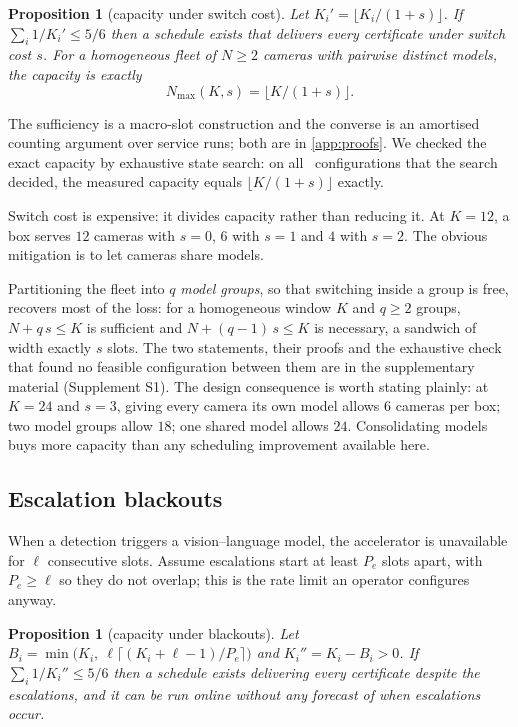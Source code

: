 \documentclass[final,5p,times,twocolumn]{elsarticle}
\newtheorem{proposition}[theorem]{Proposition}
\theoremstyle{definition}
\newcommand{\Nc}{N}
\newcommand{\Ki}{K_i}
\begin{document}
\begin{proposition}[capacity under switch cost]\label{prop:switch}
Let $K_i'=\lfloor \Ki/(1+s)\rfloor$. If $\sum_i 1/K_i'\le 5/6$ then a schedule exists that delivers
every certificate under switch cost $s$. For a homogeneous fleet of $\Nc\ge2$ cameras with
pairwise distinct models, the capacity is exactly
\[
N_{\max}(K,s)=\big\lfloor K/(1+s)\big\rfloor .
\]
\end{proposition}

The sufficiency is a macro-slot construction and the converse is an amortised counting argument
over service runs; both are in \ref{app:proofs}. We checked the exact capacity by exhaustive state
search: on all \numCtwoClean\ configurations that the search decided, the measured capacity equals
$\lfloor K/(1+s)\rfloor$ exactly.

Switch cost is expensive: it divides capacity rather than reducing it. At $K=12$, a box serves
$12$ cameras with $s=0$, $6$ with $s=1$ and $4$ with $s=2$. The obvious mitigation is to let
cameras share models.

Partitioning the fleet into $q$ \emph{model groups}, so that switching inside a group is free,
recovers most of the loss: for a homogeneous window $K$ and $q\ge2$ groups, $\Nc+q\,s\le K$ is
sufficient and $\Nc+(q-1)\,s\le K$ is necessary, a sandwich of width exactly $s$ slots. The two
statements, their proofs and the exhaustive check that found no feasible configuration between
them are in the supplementary material (Supplement S1). The design consequence is worth stating plainly: at $K=24$ and
$s=3$, giving every camera its own model allows $6$ cameras per box; two model groups allow $18$;
one shared model allows $24$. Consolidating models buys more capacity than any scheduling
improvement available here.

\subsection{Escalation blackouts}\label{sec:blackout}
When a detection triggers a vision--language model, the accelerator is unavailable for $\ell$
consecutive slots. Assume escalations start at least $P_e$ slots apart, with $P_e\ge\ell$ so they
do not overlap; this is the rate limit an operator configures anyway.

\begin{proposition}[capacity under blackouts]\label{prop:blackout}
Let $B_i=\min\!\big(\Ki,\ \ell\lceil(\Ki+\ell-1)/P_e\rceil\big)$ and $K_i''=\Ki-B_i>0$. If
$\sum_i 1/K_i''\le5/6$ then a schedule exists delivering every certificate despite the escalations,
and it can be run online without any forecast of when escalations occur.
\end{proposition}
\end{document}
